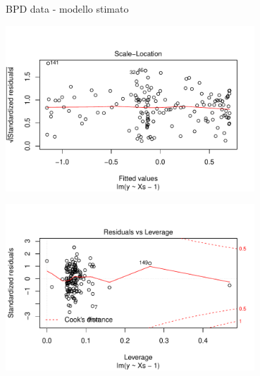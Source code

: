 \documentclass{beamer}\usepackage[]{graphicx}\usepackage[]{color}
\newenvironment{knitrout}{}{} %
\begin{document}
\begin{frame}[fragile]{BPD data - modello stimato}
\begin{center}
\begin{knitrout}
\includegraphics[width=0.7\textwidth]{figure/020-regression-1unnamed-chunk-40-3} 

\includegraphics[width=0.7\textwidth]{figure/020-regression-1unnamed-chunk-40-4} 

\end{knitrout}
\end{center}

\end{frame}
\end{document}

